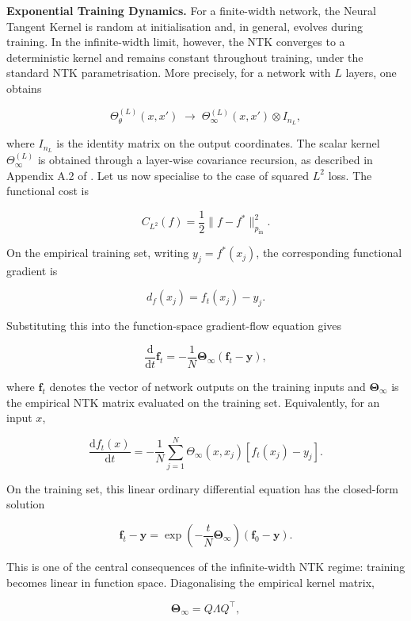 \textbf{Exponential Training Dynamics.} For a finite-width network, the Neural Tangent Kernel is random at initialisation and, in general, evolves during training. In the infinite-width limit, however, the NTK converges to a deterministic kernel and remains constant throughout training, under the standard NTK parametrisation. More precisely, for a network with \(L\) layers, one obtains

\[
\Theta^{(L)}_\theta(x,x')
\;\longrightarrow\;
\Theta^{(L)}_\infty(x,x') \otimes I_{n_L},
\label{keyeq:infinite-width-limit}
\]

where \(I_{n_L}\) is the identity matrix on the output coordinates. The scalar kernel \(\Theta^{(L)}_\infty\) is obtained through a layer-wise covariance recursion, as described in Appendix A.2 of \citet{jacot2018ntk}. Let us now specialise to the case of squared \(L^2\) loss. The functional cost is

\[
C_{L^2}(f)
=
\frac{1}{2}
\|f-f^\ast\|_{p_{\mathrm{in}}}^{2}.
\]

On the empirical training set, writing \(y_j=f^\ast(x_j)\), the corresponding functional gradient is

\[
d_f(x_j)
=
f_t(x_j)-y_j.
\]

Substituting this into the function-space gradient-flow equation gives

\[
\frac{\mathrm{d}}{\mathrm{d}t}\mathbf{f}_t
=
-
\frac{1}{N}
\boldsymbol{\Theta}_\infty
\left(
\mathbf{f}_t-\mathbf{y}
\right),
\]

where \(\mathbf{f}_t\) denotes the vector of network outputs on the training inputs and \(\boldsymbol{\Theta}_\infty\) is the empirical NTK matrix evaluated on the training set. Equivalently, for an input \(x\),

\[
\frac{\mathrm{d} f_t(x)}{\mathrm{d}t}
=
-
\frac{1}{N}
\sum_{j=1}^{N}
\Theta_\infty(x,x_j)
\left[
f_t(x_j)-y_j
\right].
\]

On the training set, this linear ordinary differential equation has the closed-form solution

\[
\mathbf{f}_t-\mathbf{y}
=
\exp\!\left(
-
\frac{t}{N}
\boldsymbol{\Theta}_\infty
\right)
\left(
\mathbf{f}_0-\mathbf{y}
\right).
\label{keyeq:ntk-closed-form}
\]

This is one of the central consequences of the infinite-width NTK regime: training becomes linear in function space. Diagonalising the empirical kernel matrix,

\[
\boldsymbol{\Theta}_\infty
=
Q\Lambda Q^\top,
\]

